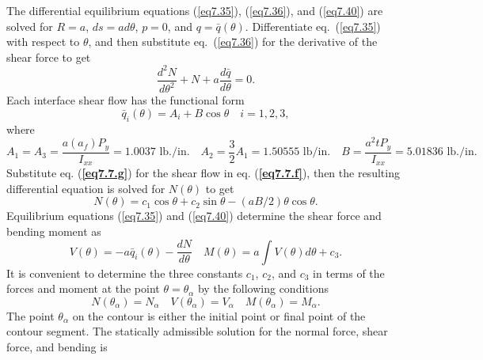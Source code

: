 \documentclass{AeroStructure-ERJohnson}
\begin{document}
\begin{example}
The differential equilibrium equations (\ref{eq7.35}), (\ref{eq7.36}), and (\ref{eq7.40}) are solved for $\textit{R} = a$, $\textit{ds} = ad\theta$, $p=0$, and $q=\bar{q}(\theta)$. Differentiate eq.~(\ref{eq7.35}) with respect to $\theta$, and then substitute eq.~(\ref{eq7.36}) for the derivative of the shear force to get
\begin{equation}
\frac{d^{2} N}{d \theta^{2}}+N+a \frac{d \bar{q}}{d \theta}=0. \label{eq7.7.f}\tag{f}
\end{equation}
Each interface shear flow has the functional form
\begin{equation}
\bar{q}_{i}(\theta)=A_{i}+B \cos \theta \quad i=1,2,3, \label{eq7.7.g}\tag{g}
\end{equation}
where
\begin{equation}
A_{1}=A_{3}=\frac{a\left(a_{f}\right) P_{y}}{I_{x x}}=1.0037 \textrm{ lb} . / \mathrm{in} . \quad A_{2}=\frac{3}{2} A_{1}=1.50555 \textrm{ lb} / \mathrm{in} . \quad B=\frac{a^{2} t P_{y}}{I_{x x}}=5.01836 \textrm{ lb} . / \mathrm{in.}\label{eq7.7.h}\tag{h}
\end{equation}
Substitute eq. (\textbf{\ref{eq7.7.g}}) for the shear flow in eq. (\textbf{\ref{eq7.7.f}}), then the resulting differential equation is solved for $N(\theta)$ to get
\begin{equation}
N(\theta)=c_{1} \cos \theta+c_{2} \sin \theta-(a B / 2) \theta \cos \theta. \label{eq7.7.i}\tag{i}
\end{equation}
Equilibrium equations (\ref{eq7.35}) and (\ref{eq7.40}) determine the shear force and bending moment as
\begin{equation}
V(\theta)=-a \bar{q}_{i}(\theta)-\frac{d N}{d \theta} \quad M(\theta)=a \int V(\theta) d \theta+c_{3}. \label{eq7.7.j}\tag{j}
\end{equation}
It is convenient to determine the three constants $c_1$, $c_2$, and $c_3$ in terms of the forces and moment at the point $\theta=\theta_{\alpha}$ by the following conditions
\begin{equation}
N\left(\theta_{\alpha}\right)=N_{\alpha} \quad V\left(\theta_{\alpha}\right)=V_{\alpha} \quad M\left(\theta_{\alpha}\right)=M_{\alpha}. \label{eq7.7.k}\tag{k}
\end{equation}
The point $\theta_{\alpha}$ on the contour is either the initial point or final point of the contour segment. The statically admissible solution for the normal force, shear force, and bending is
\begin{equation}

\end{equation}
\end{example}
\end{document}
